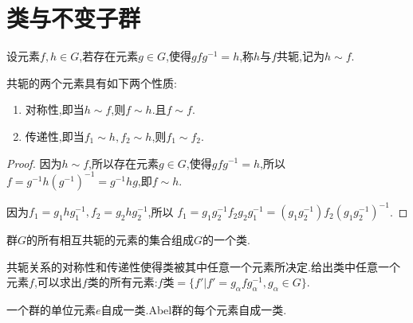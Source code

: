 \section{类与不变子群}
\begin{definition}[共轭]
    设元素$f,h\in G$,若存在元素$g \in G$,使得$gfg^{-1}=h$,称$h$与$f$共轭,记为$h\sim f$.
\end{definition}
\begin{corollary}
共轭的两个元素具有如下两个性质:
\begin{enumerate}
    \item 对称性,即当$h \sim f$,则$f \sim h$.且$f \sim f$.
    \item 传递性,即当$f_1\sim h,f_2\sim h$,则$f_1\sim f_2$.
\end{enumerate}
\end{corollary}
\begin{proof}
    因为$h\sim f$,所以存在元素$g \in G$,使得$gfg^{-1}=h$,所以$f=g^{-1}h(g^{-1})^{-1}=g^{-1}hg$,即$f \sim h$.

    因为$f_1=g_1hg_1^{-1},f_2=g_2hg_2^{-1}$,所以
$
f_1=g_1g_2^{-1}f_2g_2g_1^{-1}=(g_1g_2^{-1})f_2(g_1g_2^{-1})^{-1}
$.
\end{proof}
\begin{definition}[类]
    群$G$的所有相互共轭的元素的集合组成$G$的一个类.
\end{definition}
共轭关系的对称性和传递性使得类被其中任意一个元素所决定.给出类中任意一个元素$f$,可以求出$f$类的所有元素:$f$类$=\{f'|f'=g_\alpha fg_\alpha^{-1},g_\alpha\in G\}$.

一个群的单位元素$e$自成一类.Abel群的每个元素自成一类.

